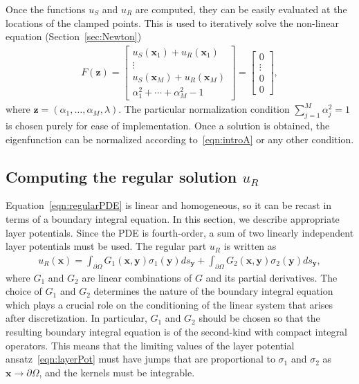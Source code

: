\documentclass[times]{article}
\newcommand{\bd}{\partial}
\newcommand{\xx}{\mathbf{x}}
\newcommand{\yy}{\mathbf{y}}
\begin{document}
Once the functions $u_S$ and $u_R$ are computed, they can be easily
evaluated at the locations of the clamped points.  This is used to
iteratively solve the non-linear equation (Section~\ref{sec:Newton})
\begin{align}
\label{eqn:mismatch}
  F(\mathbf{z}) = \left[
  \begin{array}{c}
    u_{S}(\xx_{1}) + u_{R}(\xx_{1}) \\
    \vdots \\
    u_{S}(\xx_{M}) + u_{R}(\xx_{M}) \\
    \alpha_{1}^{2} + \cdots + \alpha_{M}^{2} - 1
  \end{array}
  \right] = \left[
  \begin{array}{c}
    0 \\ \vdots \\ 0 \\ 0
  \end{array}
  \right],
\end{align}
where $\mathbf{z} = (\alpha_1,\ldots,\alpha_M,\lambda)$.  The particular
normalization condition $\sum_{j=1}^M \alpha_j^2 = 1$ is chosen purely
for ease of implementation. Once a solution is obtained, the
eigenfunction can be normalized according to~\eqref{eqn:introA} or any
other condition.

\subsection{Computing the regular solution $u_R$}
\label{sec:layer_pots}
Equation~\eqref{eqn:regularPDE} is linear and homogeneous, so it can be
recast in terms of a boundary integral equation.  In this section, we
describe appropriate layer potentials. Since the PDE is fourth-order, a
sum of two linearly independent layer potentials must be used.  The
regular part $u_R$ is written as
\begin{align}
  u_{R}(\xx) = \int_{\bd\Omega} G_{1}(\xx,\yy)\sigma_{1}(\yy) ds_{\yy} +
               \int_{\bd\Omega} G_{2}(\xx,\yy)\sigma_{2}(\yy) ds_{\yy},
  \label{eqn:layerPot}
\end{align}
where $G_{1}$ and $G_{2}$ are linear combinations of $G$ and its partial
derivatives.  The choice of $G_{1}$ and $G_{2}$ determines the nature of
the boundary integral equation which plays a crucial role on the
conditioning of the linear system that arises after discretization.  In
particular, $G_{1}$ and $G_{2}$ should be chosen so that the resulting
boundary integral equation is of the second-kind with compact integral
operators.  This means that the limiting values of the layer potential
ansatz~\eqref{eqn:layerPot} must have jumps that are proportional to
$\sigma_1$ and $\sigma_2$ as $\xx \rightarrow \bd\Omega$, and the
kernels must be integrable.
\end{document}

